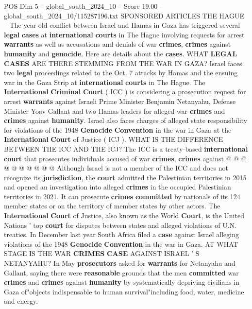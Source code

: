 \begin{textsample}{POS Dim 5 – global\_south\_2024\_10 – Score 19.00 – global\_south\_2024\_10/115287196.txt}  \label{ex:f5_pos_343}
SPONSORED ARTICLES THE HAGUE -- The year-old conflict between Israel and Hamas in Gaza has triggered several \textbf{legal} \textbf{cases} at \textbf{international} \textbf{courts} in The Hague involving requests for arrest \textbf{warrants} as well as accusations and denials of war \textbf{crimes}, \textbf{crimes} against \textbf{humanity} and \textbf{genocide}.
Here are details about the \textbf{cases}.
WHAT \textbf{LEGAL} \textbf{CASES} ARE THERE STEMMING FROM THE WAR IN GAZA?
Israel faces two \textbf{legal} proceedings related to the Oct. 7 attacks by Hamas and the ensuing war in the Gaza Strip at \textbf{international} \textbf{courts} in The Hague.
The \textbf{International} \textbf{Criminal} \textbf{Court} ( ICC ) is considering a prosecution request for arrest \textbf{warrants} against Israeli Prime Minister Benjamin Netanyahu, Defense Minister Yoav Gallant and two Hamas leaders for alleged war \textbf{crimes} and \textbf{crimes} against \textbf{humanity}.
Israel also faces charges of alleged state responsibility for violations of the 1948 \textbf{Genocide} \textbf{Convention} in the war in Gaza at the \textbf{International} \textbf{Court} of Justice ( ICJ ).
WHAT IS THE DIFFERENCE BETWEEN THE ICC AND THE ICJ?
The ICC is a treaty-based \textbf{international} \textbf{court} that prosecutes individuals accused of war \textbf{crimes}, \textbf{crimes} against @ @ @ @ @ @ @ @ @ @ Although Israel is not a member of the ICC and does not recognize its \textbf{jurisdiction}, the \textbf{court} admitted the Palestinian territories in 2015 and opened an investigation into alleged \textbf{crimes} in the occupied Palestinian territories in 2021.
It can prosecute \textbf{crimes} \textbf{committed} by nationals of its 124 member states or on the territory of member states by other actors.
The \textbf{International} \textbf{Court} of Justice, also known as the World \textbf{Court}, is the United Nations ' top \textbf{court} for disputes between states and alleged violations of U.N. treaties.
In December last year South Africa filed a \textbf{case} against Israel alleging violations of the 1948 \textbf{Genocide} \textbf{Convention} in the war in Gaza.
AT WHAT STAGE IS THE WAR \textbf{CRIMES} \textbf{CASE} AGAINST ISRAEL ' S NETANYAHU?
In May \textbf{prosecutors} asked for \textbf{warrants} for Netanyahu and Gallant, saying there were \textbf{reasonable} grounds that the men \textbf{committed} war \textbf{crimes} and \textbf{crimes} against \textbf{humanity} by systematically depriving civilians in Gaza of"objects indispensable to human survival"including food, water, medicine and energy.

\end{textsample}
